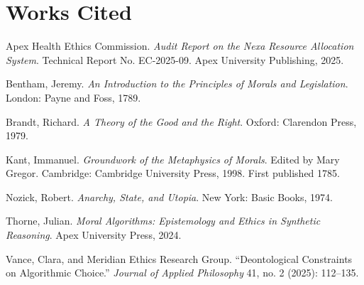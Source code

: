 \documentclass[11pt,a4paper]{article}
\begin{document}
\section*{Works Cited}

\begin{small}
\begin{description}[leftmargin=1.5em, style=unboxed, itemsep=0.08em]
    \item Apex Health Ethics Commission. \textit{Audit Report on the Nexa Resource Allocation System}. Technical Report No. EC-2025-09. Apex University Publishing, 2025.
    \item Bentham, Jeremy. \textit{An Introduction to the Principles of Morals and Legislation}. London: Payne and Foss, 1789.
    \item Brandt, Richard. \textit{A Theory of the Good and the Right}. Oxford: Clarendon Press, 1979.
    \item Kant, Immanuel. \textit{Groundwork of the Metaphysics of Morals}. Edited by Mary Gregor. Cambridge: Cambridge University Press, 1998. First published 1785.
    \item Nozick, Robert. \textit{Anarchy, State, and Utopia}. New York: Basic Books, 1974.
    \item Thorne, Julian. \textit{Moral Algorithms: Epistemology and Ethics in Synthetic Reasoning}. Apex University Press, 2024.
    \item Vance, Clara, and Meridian Ethics Research Group. ``Deontological Constraints on Algorithmic Choice.'' \textit{Journal of Applied Philosophy} 41, no. 2 (2025): 112--135.
\end{description}
\end{small}

\vspace{0.2em}
\end{document}
